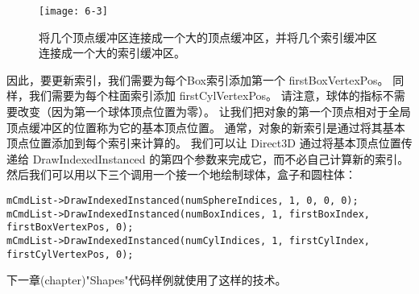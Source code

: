 \begin{flushleft}
\begin{figure}[h]
    \texttt{[image: 6-3]}
    \centering
    \caption{将几个顶点缓冲区连接成一个大的顶点缓冲区，并将几个索引缓冲区连接成一个大的索引缓冲区。}
    \label{fig:6-3}
\end{figure}

因此，要更新索引，我们需要为每个Box索引添加第一个 firstBoxVertexPos。 同样，我们需要为每个柱面索引添加 firstCylVertexPos。 请注意，球体的指标不需要改变（因为第一个球体顶点位置为零）。 让我们把对象的第一个顶点相对于全局顶点缓冲区的位置称为它的基本顶点位置。 通常，对象的新索引是通过将其基本顶点位置添加到每个索引来计算的。 我们可以让 Direct3D 通过将基本顶点位置传递给 DrawIndexedInstanced 的第四个参数来完成它，而不必自己计算新的索引。\\
然后我们可以用以下三个调用一个接一个地绘制球体，盒子和圆柱体：\\
\begin{lstlisting}
mCmdList->DrawIndexedInstanced(numSphereIndices, 1, 0, 0, 0);
mCmdList->DrawIndexedInstanced(numBoxIndices, 1, firstBoxIndex, firstBoxVertexPos, 0);
mCmdList->DrawIndexedInstanced(numCylIndices, 1, firstCylIndex, firstCylVertexPos, 0);
\end{lstlisting}
下一章(chapter)"Shapes"代码样例就使用了这样的技术。
\end{flushleft}


